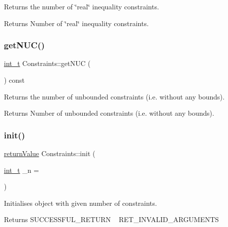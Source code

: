 Returns the number of \char`\"{}real\char`\"{} inequality constraints. \begin{DoxyReturn}{Returns}
Number of \char`\"{}real\char`\"{} inequality constraints. 
\end{DoxyReturn}
\mbox{\label{class_constraints_a007ece0d52cfc75f429eb7d79f4c8f2a}} 
\subsubsection{\texorpdfstring{get\+N\+U\+C()}{getNUC()}}
{\footnotesize\ttfamily \hyperlink{_types_8hpp_ab6fd6105e64ed14a0c9281326f05e623}{int\+\_\+t} Constraints\+::get\+N\+UC (\begin{DoxyParamCaption}{ }\end{DoxyParamCaption}) const\hspace{0.3cm}{\ttfamily [inline]}}

Returns the number of unbounded constraints (i.\+e. without any bounds). \begin{DoxyReturn}{Returns}
Number of unbounded constraints (i.\+e. without any bounds). 
\end{DoxyReturn}
\mbox{\label{class_constraints_abb4139ecad1739efe85bcb03b22f282d}} 
\subsubsection{\texorpdfstring{init()}{init()}}
{\footnotesize\ttfamily \hyperlink{_message_handling_8hpp_a81d556f613bfbabd0b1f9488c0fa865e}{return\+Value} Constraints\+::init (\begin{DoxyParamCaption}\item[{\hyperlink{_types_8hpp_ab6fd6105e64ed14a0c9281326f05e623}{int\+\_\+t}}]{\+\_\+n = {} }\end{DoxyParamCaption})}

Initialises object with given number of constraints. \begin{DoxyReturn}{Returns}
S\+U\+C\+C\+E\+S\+S\+F\+U\+L\+\_\+\+R\+E\+T\+U\+RN ~\newline
 R\+E\+T\+\_\+\+I\+N\+V\+A\+L\+I\+D\+\_\+\+A\+R\+G\+U\+M\+E\+N\+TS 
\end{DoxyReturn}

